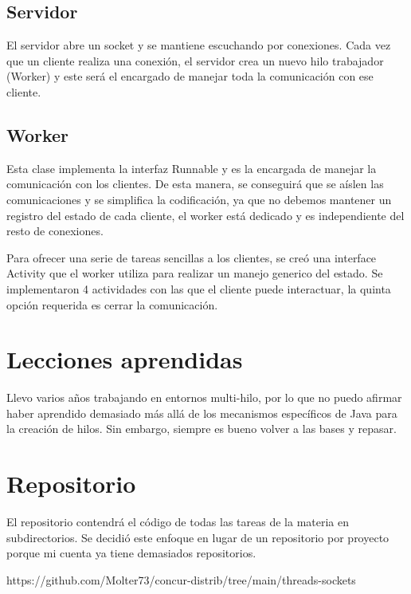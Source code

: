 \documentclass[a4paper]{article}
\begin{document}
\subsection{Servidor}

El servidor abre un socket y se mantiene escuchando por conexiones. Cada vez
que un cliente realiza una conexión, el servidor crea un nuevo hilo trabajador
(Worker) y este será el encargado de manejar toda la comunicación con ese
cliente.

\subsection{Worker}

Esta clase implementa la interfaz Runnable y es la encargada de manejar
la comunicación con los clientes. De esta manera, se conseguirá que se aíslen
las comunicaciones y se simplifica la codificación, ya que no debemos mantener
un registro del estado de cada cliente, el worker está dedicado y es
independiente del resto de conexiones.

Para ofrecer una serie de tareas sencillas a los clientes, se creó una
interface Activity que el worker utiliza para realizar un manejo generico
del estado. Se implementaron 4 actividades con las que el cliente puede
interactuar, la quinta opción requerida es cerrar la comunicación.

\begin{figure}[H]
    \centering
    \scalebox{.6}{
        
    }
\end{figure}

\section{Lecciones aprendidas}

Llevo varios años trabajando en entornos multi-hilo, por lo que no puedo
afirmar haber aprendido demasiado más allá de los mecanismos específicos de
Java para la creación de hilos. Sin embargo, siempre es bueno volver a las
bases y repasar.

\section{Repositorio}

El repositorio contendrá el código de todas las tareas de la materia en
subdirectorios. Se decidió este enfoque en lugar de un repositorio por proyecto
porque mi cuenta ya tiene demasiados repositorios.

https://github.com/Molter73/concur-distrib/tree/main/threads-sockets
\end{document}

